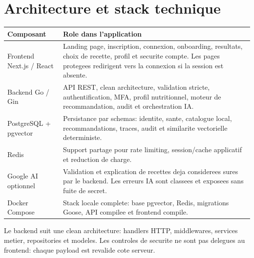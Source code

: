 \documentclass[10pt,a4paper]{article}
\begin{document}
\section{Architecture et stack technique}
\begin{tabularx}{\textwidth}{@{}L{3.2cm}Y@{}}
\toprule
\textbf{Composant} & \textbf{Role dans l'application} \\
\midrule
Frontend Next.js / React & Landing page, inscription, connexion, onboarding, resultats, choix de recette, profil et securite compte. Les pages protegees redirigent vers la connexion si la session est absente. \\
Backend Go / Gin & API REST, clean architecture, validation stricte, authentification, MFA, profil nutritionnel, moteur de recommandation, audit et orchestration IA. \\
PostgreSQL + pgvector & Persistance par schemas: identite, sante, catalogue local, recommandations, traces, audit et similarite vectorielle deterministe. \\
Redis & Support partage pour rate limiting, session/cache applicatif et reduction de charge. \\
Google AI optionnel & Validation et explication de recettes deja considerees sures par le backend. Les erreurs IA sont classees et exposees sans fuite de secret. \\
Docker Compose & Stack locale complete: base pgvector, Redis, migrations Goose, API compilee et frontend compile. \\
\bottomrule
\end{tabularx}

Le backend suit une clean architecture: handlers HTTP, middlewares, services metier, repositories et modeles. Les controles de securite ne sont pas delegues au frontend: chaque payload est revalide cote serveur.
\end{document}
